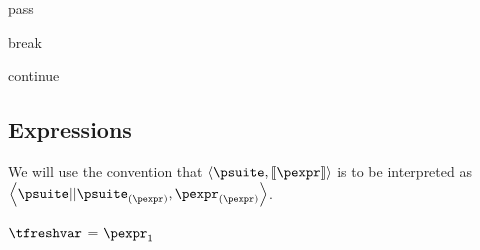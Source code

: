 \documentclass{article}
\begin{document}
\begin{mathpar}
\end{mathpar}

\newsavebox{\passBox}
\begin{lrbox}{\passBox}
\begin{python}
pass
\end{python}
\end{lrbox}

\begin{mathpar}
\end{mathpar}

\newsavebox{\breakBox}
\begin{lrbox}{\breakBox}
\begin{python}
break
\end{python}
\end{lrbox}

\begin{mathpar}
\end{mathpar}

\newsavebox{\continueBox}
\begin{lrbox}{\continueBox}
\begin{python}
continue
\end{python}
\end{lrbox}

\begin{mathpar}
\end{mathpar}

\subsection{Expressions}

We will use the convention that $\left<\psuite, \meaningof{\pexpr}\right>$ is to be interpreted as
$\left<\psuite || \psuite_{(\pexpr)}, \pexpr_{(\pexpr)}\right>$.

\newsavebox{\andBox}
\begin{lrbox}{\andBox}
\begin{python}
$\tfreshvar$ = $\pexpr_1$
\end{python}
\end{lrbox}
\end{document}
